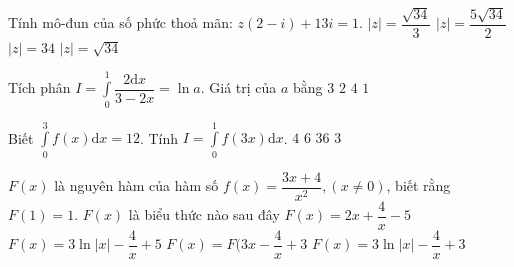 \begin{ex}%
	Tính mô-đun của số phức   thoả mãn: $z\left(2-i\right)+13i=1$.
	\choice
	{$\left| z\right|=\dfrac{\sqrt{34}}{3}$}
	{$\left| z\right|=\dfrac{5\sqrt{34}}{2}$}
	{$\left| z\right|=34$}
	{\True $\left| z\right|=\sqrt{34}$}
\end{ex}
\begin{ex}%
	Tích phân $I=\displaystyle \int \limits_0^1{\dfrac{2\mathrm{d}x}{3-2x}}=\ln a$. Giá trị của $a$ bằng
	\choice
	{\True $3$}
	{$2$}
	{$4$}
	{$1$}
\end{ex}
\begin{ex}%
	Biết $\displaystyle \int \limits_0^3f(x)\mathrm{d}x=12$. Tính $I=\displaystyle \int \limits_0^1f\left(3x\right)\mathrm{d}x$.
	\choice
	{\True $4$}
	{$6$}
	{$36$}
	{$3$}
\end{ex}
\begin{ex}%
	$F(x)$ là nguyên hàm của hàm số $f(x)=\dfrac{3x+4}{x^2},\left(x\ne 0\right)$, biết rằng $F(1) = 1$. $F(x)$ là biểu thức nào sau đây
	\choice
	{$F(x)=2x+\dfrac{4}{x}-5$}
	{\True $F(x)=3\ln \left| x\right|-\dfrac{4}{x}+5$}
	{$F(x)=F(3x-\dfrac{4}{x}+3$}
	{$F(x)=3\ln \left| x\right|-\dfrac{4}{x}+3$}
\end{ex}
